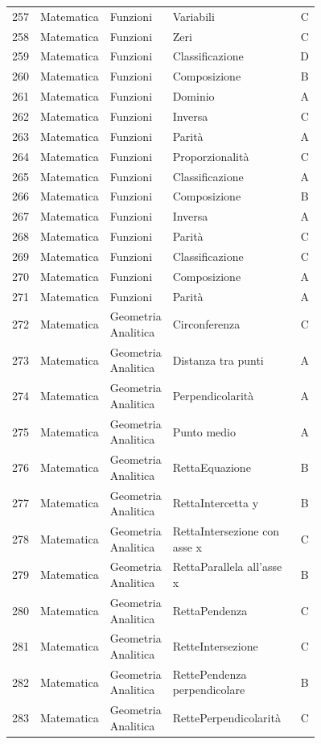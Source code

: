 \documentclass[20pt, a4paper]{article}
\begin{document}
\begin{longtable}{@{}r>{\raggedright\arraybackslash}p{0.14\linewidth}>{\raggedright\arraybackslash}p{0.20\linewidth}>{\raggedright\arraybackslash}p{0.42\linewidth}c@{}}
257 & Matematica & Funzioni & Variabili & C \\
258 & Matematica & Funzioni & Zeri & C \\
259 & Matematica & Funzioni & Classificazione & D \\
260 & Matematica & Funzioni & Composizione & B \\
261 & Matematica & Funzioni & Dominio & A \\
262 & Matematica & Funzioni & Inversa & C \\
263 & Matematica & Funzioni & Parità & A \\
264 & Matematica & Funzioni & Proporzionalità & C \\
265 & Matematica & Funzioni & Classificazione & A \\
266 & Matematica & Funzioni & Composizione & B \\
267 & Matematica & Funzioni & Inversa & A \\
268 & Matematica & Funzioni & Parità & C \\
269 & Matematica & Funzioni & Classificazione & C \\
270 & Matematica & Funzioni & Composizione & A \\
271 & Matematica & Funzioni & Parità & A \\
272 & Matematica & Geometria Analitica & Circonferenza & C \\
273 & Matematica & Geometria Analitica & Distanza tra punti & A \\
274 & Matematica & Geometria Analitica & Perpendicolarità & A \\
275 & Matematica & Geometria Analitica & Punto medio & A \\
276 & Matematica & Geometria Analitica & RettaEquazione & B \\
277 & Matematica & Geometria Analitica & RettaIntercetta y & B \\
278 & Matematica & Geometria Analitica & RettaIntersezione con asse x & C \\
279 & Matematica & Geometria Analitica & RettaParallela all'asse x & B \\
280 & Matematica & Geometria Analitica & RettaPendenza & C \\
281 & Matematica & Geometria Analitica & RetteIntersezione & C \\
282 & Matematica & Geometria Analitica & RettePendenza perpendicolare & B \\
283 & Matematica & Geometria Analitica & RettePerpendicolarità & C \\

\end{longtable}
\end{document}
